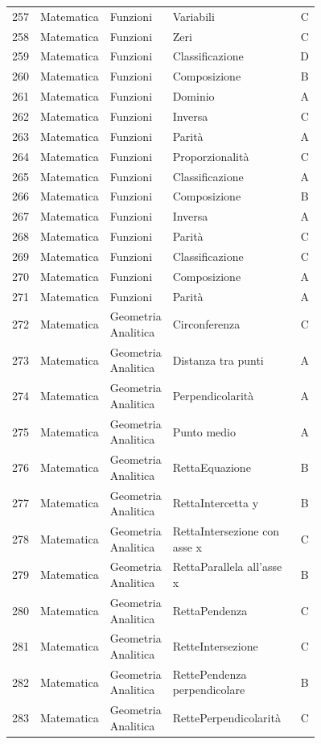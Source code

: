 \documentclass[20pt, a4paper]{article}
\begin{document}
\begin{longtable}{@{}r>{\raggedright\arraybackslash}p{0.14\linewidth}>{\raggedright\arraybackslash}p{0.20\linewidth}>{\raggedright\arraybackslash}p{0.42\linewidth}c@{}}
257 & Matematica & Funzioni & Variabili & C \\
258 & Matematica & Funzioni & Zeri & C \\
259 & Matematica & Funzioni & Classificazione & D \\
260 & Matematica & Funzioni & Composizione & B \\
261 & Matematica & Funzioni & Dominio & A \\
262 & Matematica & Funzioni & Inversa & C \\
263 & Matematica & Funzioni & Parità & A \\
264 & Matematica & Funzioni & Proporzionalità & C \\
265 & Matematica & Funzioni & Classificazione & A \\
266 & Matematica & Funzioni & Composizione & B \\
267 & Matematica & Funzioni & Inversa & A \\
268 & Matematica & Funzioni & Parità & C \\
269 & Matematica & Funzioni & Classificazione & C \\
270 & Matematica & Funzioni & Composizione & A \\
271 & Matematica & Funzioni & Parità & A \\
272 & Matematica & Geometria Analitica & Circonferenza & C \\
273 & Matematica & Geometria Analitica & Distanza tra punti & A \\
274 & Matematica & Geometria Analitica & Perpendicolarità & A \\
275 & Matematica & Geometria Analitica & Punto medio & A \\
276 & Matematica & Geometria Analitica & RettaEquazione & B \\
277 & Matematica & Geometria Analitica & RettaIntercetta y & B \\
278 & Matematica & Geometria Analitica & RettaIntersezione con asse x & C \\
279 & Matematica & Geometria Analitica & RettaParallela all'asse x & B \\
280 & Matematica & Geometria Analitica & RettaPendenza & C \\
281 & Matematica & Geometria Analitica & RetteIntersezione & C \\
282 & Matematica & Geometria Analitica & RettePendenza perpendicolare & B \\
283 & Matematica & Geometria Analitica & RettePerpendicolarità & C \\

\end{longtable}
\end{document}
